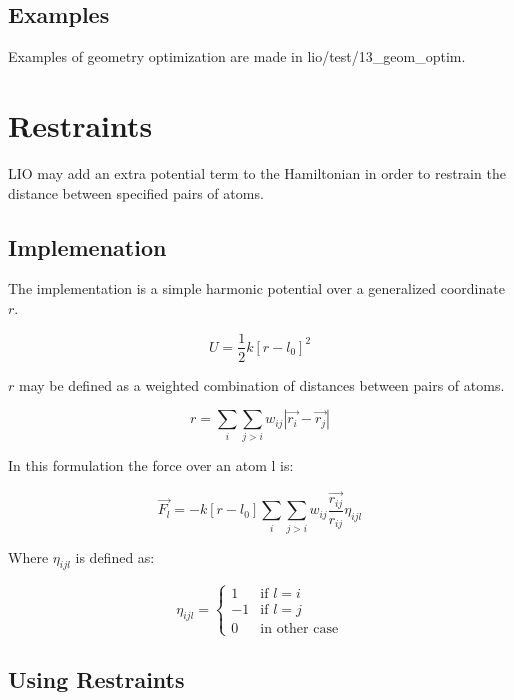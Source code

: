     \subsection{Examples}
    
    Examples of geometry optimization are made in lio/test/13\_geom\_optim.
    
\newpage
\section{Restraints}
LIO may add an extra potential term to the Hamiltonian in order to restrain the distance between specified pairs of atoms.

    \subsection{Implemenation}
    The implementation is a simple harmonic potential over a generalized coordinate $r$.

    \begin{equation}
      U=\frac{1}{2} k [r - l_0]^2  
      \label{E_restrain}
    \end{equation}

    $r$ may be defined as a weighted combination of distances between pairs of atoms.

    \begin{equation}
      r=  \sum_{i} \sum_{j>i} w_{ij} |\vec{r_i} - \vec{r_j}|
      \label{gen_coord}
    \end{equation}

    In this formulation the force over an atom l is:

    \begin{equation}
      \vec{F_l}= -k [r - l_0] \sum_{i} \sum_{j>i} w_{ij} \frac{\vec{r_{ij}}}{r_{ij}} \eta_{ijl}     
      \label{rest_force}
    \end{equation}

    Where $\eta_{ijl}$ is defined as:

    \begin{equation*}
      \eta_{ijl} =
       \begin{cases}
          1 & \text{if $l=i$}\\
         -1 & \text{if $l=j$}\\
          0 & \text{in other case}
       \end{cases}
       \label{eta}
    \end{equation*}


    \subsection{Using Restraints}

